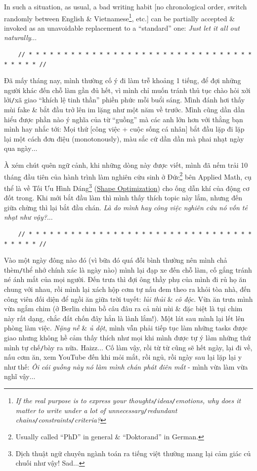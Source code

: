 \documentclass[12pt]{article}
\begin{document}
In such a situation, as usual, a bad writing habit [no chronological order, switch randomly between English \& Vietnamese\footnote{{\it If the real purpose is to express your thoughts{\tt/}ideas{\tt/}emotions, why does it matter to write under a lot of unnecessary{\tt/}redundant chains{\tt/}constraints{\tt/}criteria?}}, etc.] can be partially accepted \& invoked as an unavoidable replacement to a ``standard'' one: {\it Just let it all out naturally$\ldots$}

\begin{verbatim}
	// * * * * * * * * * * * * * * * * * * * * * * * * * * * * * * * * * * * * * //
\end{verbatim}

\noindent
{} Đã mấy tháng nay, mình thường cố ý đi làm trễ khoảng 1 tiếng, để đợi những người khác đến chỗ làm gần đủ hết, vì mình chỉ muốn tránh thủ tục chào hỏi xởi lởi{\tt/}xã giao ``khích lệ tinh thần'' phiền phức mỗi buổi sáng. Mình đánh hơi thấy mùi fake \& bắt đầu trở lên im lặng như một năm về trước. Mình cũng dần dần hiểu được phần nào ý nghĩa của từ ``guồng'' mà các anh lớn hơn với thằng bạn mình hay nhắc tới: Mọi thứ [công việc + cuộc sống cá nhân] bắt đầu lặp đi lặp lại một cách đơn điệu (monotonously), màu sắc cứ dần dần mà phai nhạt ngày qua ngày$\ldots$

À xém chút quên ngữ cảnh, khi những dòng này được viết, mình đã nếm trải 10 tháng đầu tiên của hành trình làm nghiên cứu sinh ở Đức\footnote{Usually called ``PhD'' in general \& ``Doktorand'' in German.} bên Applied Math, cụ thể là về Tối Ưu Hình Dáng\footnote{Dịch thuật ngữ chuyên ngành toán ra tiếng việt thường mang lại cảm giác củ chuối như vậy! Sad$\ldots$} (\href{https://en.wikipedia.org/wiki/Shape_optimization}{Shape Optimization}) cho ống dẫn khí của động cơ đốt trong. Khi mới bắt đầu làm thì mình thấy thích topic này lắm, nhưng đến giữa chừng thì lại bắt đầu chán. {\it Là do mình hay công việc nghiên cứu nó vốn tẻ nhạt như vậy?}$\ldots$

\begin{verbatim}
	// * * * * * * * * * * * * * * * * * * * * * * * * * * * * * * * * * * * * * //
\end{verbatim}

\noindent
{} Vào một ngày đông nào đó (vì bữa đó quá đỗi bình thường nên mình chả thèm{\tt/}thể nhớ chính xác là ngày nào) mình lại đạp xe đến chỗ làm, cố gắng tránh né ánh mắt của mọi người. Đến trưa thì đợi ông thầy phụ của mình đi rủ họ ăn chung với nhau, rồi mình lại xách hộp cơm tự nấu đem theo ra khỏi tòa nhà, đến công viên đối diện để ngồi ăn giữa trời tuyết: {\it lủi thủi} \& {\it cô độc}. Vừa ăn trưa mình vừa ngắm chim (ở Berlin chim bồ câu đâu ra cả nùi nùi \& đặc biệt là tụi chim này rất dạng, chắc đất chốn đây hẳn là lành lắm!). Một lát sau mình lại lết lên phòng làm việc. {\it Nặng nề} \& {\it ủ dột}, mình vẫn phải tiếp tục làm những tasks được giao nhưng không hề cảm thấy thích như mọi khi mình được tự ý làm những thứ mình tự chế{\tt/}bày ra nữa. Haizz$\ldots$ Cố làm vậy, rồi từ từ cũng sẽ hết ngày, lại đi về, nấu cơm ăn, xem YouTube đến khi mỏi mắt, rồi ngủ, rồi ngày sau lại lặp lại y như thế: {\it Ôi cái guồng này nó làm mình chán phát điên mất} - mình vừa làm vừa nghĩ vậy$\ldots$
\end{document}
